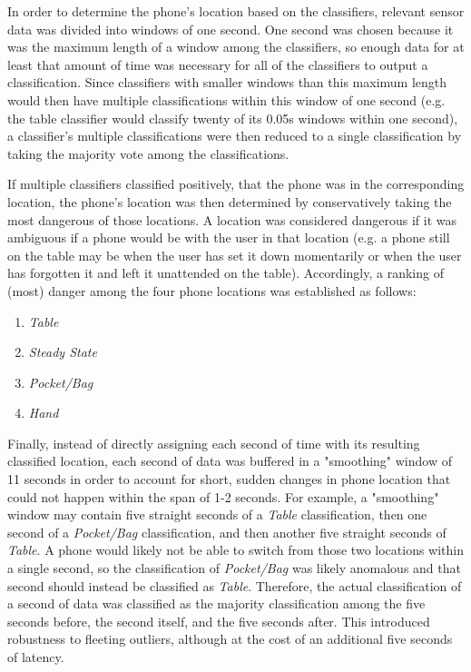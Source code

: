\documentclass{article}
\begin{document}
In order to determine the phone's location based on the classifiers, relevant sensor data was divided into windows of one second. One second
was chosen because it was the maximum length of a window among the classifiers, so enough data for at least that amount of time was necessary
for all of the classifiers to output a classification. Since classifiers with smaller windows than this maximum length would then have multiple 
classifications within this window of one second (e.g. the table classifier would classify twenty of its 0.05s windows within one second), a classifier's
multiple classifications were then reduced to a single classification by taking the majority vote among the classifications. 

If multiple classifiers classified positively, that the phone was in the corresponding location, the phone's location was then determined by conservatively taking the most dangerous
of those locations. A location was considered dangerous if it was ambiguous if a phone would be with the user in that location (e.g. a phone still on the table
may be when the user has set it down momentarily or when the user has forgotten it and left it unattended on the table). Accordingly, a ranking of (most) danger
among the four phone locations was established as follows:
\begin{enumerate}
\item \textit{Table}
\item \textit{Steady State}
\item \textit{Pocket/Bag}
\item \textit{Hand}
\end{enumerate}

Finally, instead of directly assigning each second of time with its resulting classified location, each second of data was buffered in a "smoothing" window 
of 11 seconds in order to account for short, sudden changes in phone location that could not happen within the span of 1-2 seconds. For example, a 
"smoothing" window may contain five straight seconds of a \textit{Table} classification, then one second of a \textit{Pocket/Bag} classification, and then 
another five straight seconds of \textit{Table}. A phone would likely not be able to switch from those two locations within a single second, so the classification
of \textit{Pocket/Bag} was likely anomalous and that second should instead be classified as \textit{Table}. Therefore, the actual classification of a second of
data was classified as the majority classification among the five seconds before, the second itself, and the five seconds after. This introduced robustness
to fleeting outliers, although at the cost of an additional five seconds of latency. 
\end{document}
